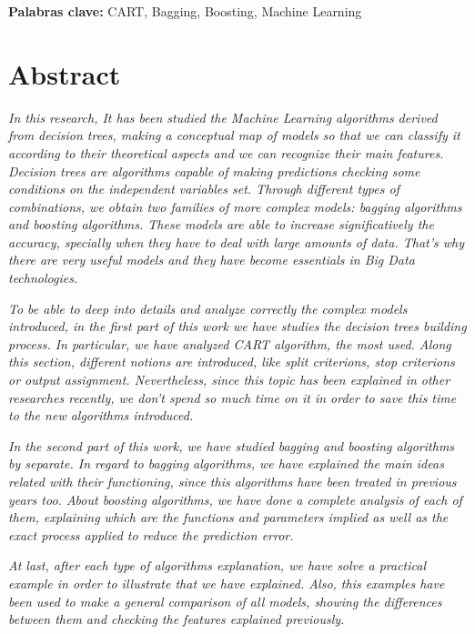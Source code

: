 \documentclass[12pt,twoside]{article}
\begin{document}
\textbf{Palabras clave:} CART, Bagging, Boosting, Machine Learning



\newpage



\section*{Abstract}

\emph{In this research, It has been studied the Machine Learning algorithms derived from decision trees, making a conceptual map of models so that we can classify it according to their theoretical aspects and we can recognize their main features. Decision trees are algorithms capable of making predictions checking some conditions on the independent variables set. Through different types of combinations, we obtain two families of more complex models: bagging algorithms and boosting algorithms. These models are able to increase significatively the accuracy, specially when they have to deal with large amounts of data. That's why there are very useful models and they have become essentials in Big Data technologies.}

\emph{To be able to deep into details and analyze correctly the complex models introduced, in the first part of this work we have studies the decision trees building process. In particular, we have analyzed CART algorithm, the most used. Along this section, different notions are introduced, like split criterions, stop criterions or output assignment. Nevertheless, since this topic has been explained in other researches recently, we don't spend so much time on it in order to save this time to the new algorithms introduced.}

\emph{In the second part of this work, we have studied bagging and boosting algorithms by separate. In regard to bagging algorithms, we have explained the main ideas related with their functioning, since this algorithms have been treated in previous years too. About boosting algorithms, we have done a complete analysis of each of them, explaining which are the functions and parameters implied as well as the exact process applied to reduce the prediction error.}

\emph{At last, after each type of algorithms explanation, we have solve a practical example in order to illustrate that we have explained. Also, this examples have been used to make a general comparison of all models, showing the differences between them and checking the features explained previously.}
\end{document}
